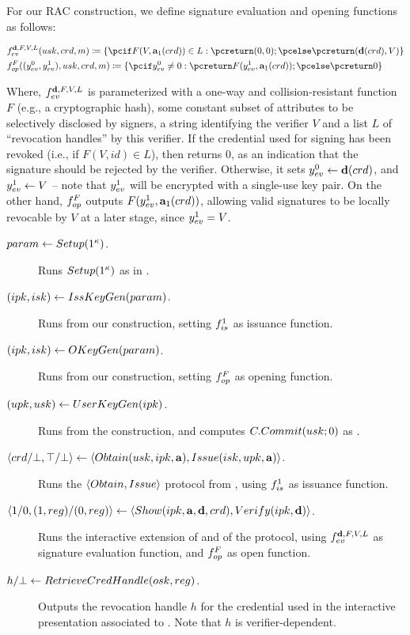 For our RAC construction, we define signature evaluation and opening functions
as follows:

\begin{align}
  & \feval^{\dattrs,F,V,L}(\usk,\cred,\msg) \coloneqq
    \lbrace
    \pcif F(V,\attrs_1(\cred)) \in L: \pcreturn (0,0);
    \pcelse \pcreturn (\dattrs(\cred),V)
    \rbrace \nonumber \\
  & \finsp^{F}((\yeval^0,\yeval^1),\usk,\cred,\msg) \coloneqq
    \lbrace
    \pcif \yeval^0 \neq 0: \pcreturn F(\yeval^1,\attrs_1(\cred));
    \pcelse \pcreturn 0
     \rbrace
  \label{eq:funcs-rac}
\end{align}

Where, $f_{ev}^{\mathbf{d},F,V,L}$ is parameterized with a one-way and
collision-resistant function $F$
(e.g., a cryptographic hash), some constant subset \dattrs of attributes to be
selectively disclosed by signers, a string identifying the verifier $V$ and a
list $L$ of ``revocation handles'' by this verifier. If the credential used for
signing has been revoked (i.e., if $F(V,id) \in L$), then \feval returns $0$, as
an indication that the signature should be rejected by the verifier. Otherwise,
it sets $y_{ev}^0 \gets \mathbf{d}(crd)$, and $y_{ev}^1 \gets V$ -- note that
$y_{ev}^1$ will be encrypted with a single-use key pair.
%
On the other hand, $f_{op}^{F}$ outputs $F(y_{ev}^1,\mathbf{a}_1(crd))$, allowing
valid signatures to be locally revocable by $V$ at a later stage, since
$y_{ev}^1=V$.

\begin{description}
\item[$param \gets Setup(1^\kappa)$.] Runs $Setup(1^\kappa)$ as in
  \CUASGen.
\item[$(ipk,isk) \gets IssKeyGen(param)$.] Runs \IKeyGen from our
  \CUASGen construction, setting $f_{is}^1$ as issuance function.
\item[$(ipk,isk) \gets OKeyGen(param)$.] Runs \OKeyGen from our
  \CUASGen construction, setting $f_{op}^F$ as opening function.
\item[$(upk,usk) \gets UserKeyGen(ipk)$.] Runs \UKeyGen from the
  \CUASGen construction, and computes $C.Commit(usk;0)$ as \upk.
\item[$\langle crd/\bot,\top/\bot \rangle \gets
  \langle Obtain(usk,ipk,\mathbf{a}),Issue(isk,upk,\mathbf{a}) \rangle$.]
  Runs the $\langle Obtain,Issue \rangle$ protocol from \CUASGen, using
  $f_{is}^1$ as issuance function.
\item[$\langle 1/0,(1,reg)/(0,reg)\rangle \gets \langle Show(ipk,\mathbf{a},\mathbf{d},crd),
  Verify(ipk,\mathbf{d}) \rangle$.]
  Runs the interactive extension of \Sign and \Verify of the \CUASGen protocol,
  using $f_{ev}^{\mathbf{d},F,V,L}$ as signature evaluation function, and
  $f_{op}^F$ as open function.
\item[$h/\bot \gets RetrieveCredHandle(osk,reg)$.]
  Outputs the revocation handle $h$ for the credential used in the interactive
  presentation associated to \utrans. Note that $h$ is verifier-dependent.
\end{description}

